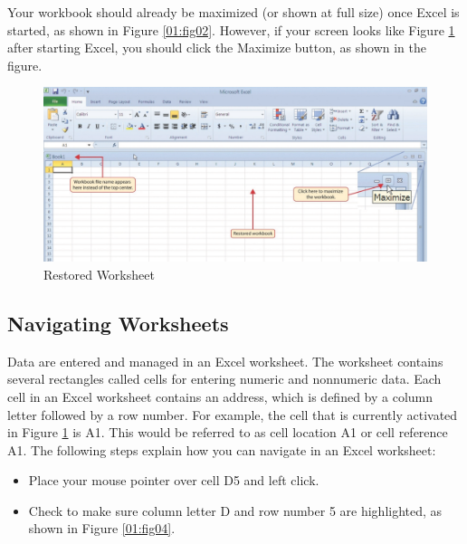 Your workbook should already be maximized (or shown at full size) once Excel is started, as shown in Figure \ref{01:fig02}. However, if your screen looks like Figure \ref{01:fig03} after starting Excel, you should click the Maximize button, as shown in the figure.

\begin{figure}[H]
	\centering
	\includegraphics[width=\maxwidth{.95\linewidth}]{gfx/ch01_fig03}
	\caption{Restored Worksheet}
	\label{01:fig03}
\end{figure}

\subsection{Navigating Worksheets}

Data are entered and managed in an Excel worksheet. The worksheet contains several rectangles called cells for entering numeric and nonnumeric data. Each cell in an Excel worksheet contains an address, which is defined by a column letter followed by a row number. For example, the cell that is currently activated in Figure \ref{01:fig03} is \textsf{A1}. This would be referred to as cell location \textsf{A1} or cell reference \textsf{A1}. The following steps explain how you can navigate in an Excel worksheet:

\begin{itemize}
	\item Place your mouse pointer over cell \textsf{D5} and left click.
	\item Check to make sure column letter D and row number 5 are highlighted, as shown in Figure \ref{01:fig04}.
\end{itemize}

